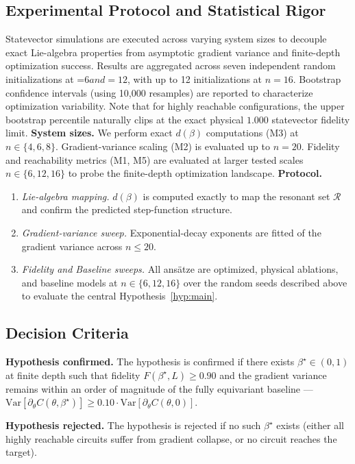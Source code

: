 \documentclass[pdflatex,sn-mathphys-num]{sn-jnl}
\theoremstyle{thmstyleone}
\theoremstyle{thmstyletwo}
\theoremstyle{thmstylethree}
\begin{document}
\subsection{Experimental Protocol and Statistical Rigor}

Statevector simulations are executed across varying system sizes to decouple exact Lie-algebra properties from asymptotic gradient variance and finite-depth optimization success. Results are aggregated across seven independent random initializations at =6$ and =12$, with up to 12 initializations at $n=16$. Bootstrap confidence intervals (using 10,000 resamples) are reported to characterize optimization variability. Note that for highly reachable configurations, the upper bootstrap percentile naturally clips at the exact physical $1.000$ statevector fidelity limit.
\textbf{System sizes.} We perform exact $d(\beta)$ computations (M3) at $n \in \{4, 6, 8\}$. Gradient-variance scaling (M2) is evaluated up to $n=20$. Fidelity and reachability metrics (M1, M5) are evaluated at larger tested scales $n \in \{6, 12, 16\}$ to probe the finite-depth optimization landscape.
\textbf{Protocol.}
\begin{enumerate}
    \item \textit{Lie-algebra mapping.} $d(\beta)$ is computed exactly to map the resonant set $\mathcal{R}$ and confirm the predicted step-function structure.
    \item \textit{Gradient-variance sweep.} Exponential-decay exponents are fitted of the gradient variance across $n \le 20$.
    \item \textit{Fidelity and Baseline sweeps.} All ans\"atze are optimized, physical ablations, and baseline models at $n \in \{6, 12, 16\}$ over the random seeds described above to evaluate the central Hypothesis~\ref{hyp:main}.
\end{enumerate}

\subsection{Decision Criteria}

\textbf{Hypothesis confirmed.} The hypothesis is confirmed if there exists $\beta^\star \in (0, 1)$ at finite depth such that fidelity $F(\beta^\star, L) \ge 0.90$ and the gradient variance remains within an order of magnitude of the fully equivariant baseline --- $\text{Var}[\partial_\theta C(\theta, \beta^\star)] \ge 0.10 \cdot \text{Var}[\partial_\theta C(\theta, 0)]$.

\textbf{Hypothesis rejected.} The hypothesis is rejected if no such $\beta^\star$ exists (either all highly reachable circuits suffer from gradient collapse, or no circuit reaches the target).
\end{document}
